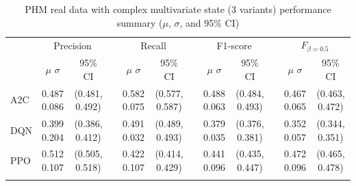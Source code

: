 \documentclass[12pt,oneside]{book}
\renewcommand{\arraystretch}{1.5}
\begin{document}
\begin{table}[htbp]
    \centering
    \caption{PHM real data with complex multivariate state (3 variants) performance summary ($\mu$, $\sigma$, and 95\% CI)}
    \label{tab:a2-phm-ms-summary}
    \setlength{\tabcolsep}{5pt}
    {\renewcommand{\arraystretch}{1.2}
    \begin{tabular}{@{}l cc c cc c cc c cc@{}}
        \arrayrulecolor{black!40}\toprule
        & \multicolumn{2}{c}{Precision} &  & \multicolumn{2}{c}{Recall} & & \multicolumn{2}{c}{F1-score} &  & \multicolumn{2}{c}{$F_{\beta=0.5}$} \\
        \cmidrule{2-3} \cmidrule{5-6} \cmidrule{8-9} \cmidrule{11-12}
        & \makecell{$\mu$ \\ $\sigma$} & 95\% CI & & \makecell{$\mu$ \\ $\sigma$} & 95\% CI & & \makecell{$\mu$ \\ $\sigma$} & 95\% CI & & \makecell{$\mu$ \\ $\sigma$} & 95\% CI \\ \midrule
        A2C & \makecell{0.487 \\ 0.086} & \makecell{(0.481,\\0.492)} & & \makecell{\textcolor{dblue}{0.582} \\ 0.075} & \makecell{(0.577,\\0.587)} & & \makecell{0.488 \\ 0.063} & \makecell{(0.484,\\0.493)} & & \makecell{0.467 \\ 0.065} & \makecell{(0.463,\\0.472)} \\ \arrayrulecolor{gray!30}\midrule
        DQN & \makecell{0.399 \\ 0.204} & \makecell{(0.386,\\0.412)} & & \makecell{0.491 \\ 0.032} & \makecell{(0.489,\\0.493)} & & \makecell{0.379 \\ 0.035} & \makecell{(0.376,\\0.381)} & & \makecell{0.352 \\ 0.057} & \makecell{(0.344,\\0.351)} \\ \arrayrulecolor{gray!30}\midrule
        PPO & \makecell{0.512 \\ 0.107} & \makecell{(0.505,\\0.518)} & & \makecell{0.422 \\ 0.107} & \makecell{(0.414,\\0.429)} & & \makecell{0.441 \\ 0.096} & \makecell{(0.435,\\0.447)} & & \makecell{0.472 \\ 0.096} & \makecell{(0.465,\\0.478)} \\ \arrayrulecolor{gray!30}\midrule

\end{tabular}}
\end{table}
\end{document}
